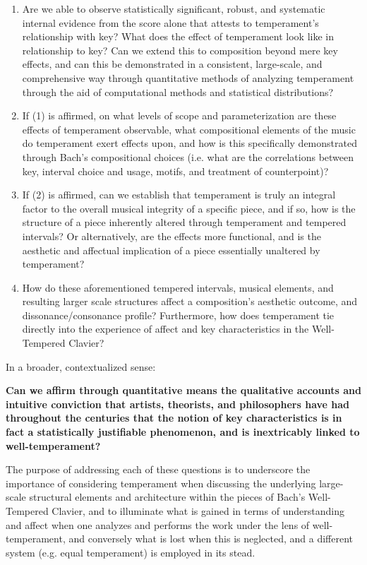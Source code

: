 \begin{enumerate}
\def\labelenumi{\arabic{enumi}.}
\tightlist
\item
  Are we able to observe statistically significant, robust, and
  systematic internal evidence from the score alone that attests to
  temperament's relationship with key? What does the effect of
  temperament look like in relationship to key? Can we extend this to
  composition beyond mere key effects, and can this be demonstrated in a
  consistent, large-scale, and comprehensive way through quantitative
  methods of analyzing temperament through the aid of computational
  methods and statistical distributions?
\item
  If (1) is affirmed, on what levels of scope and parameterization are
  these effects of temperament observable, what compositional elements
  of the music do temperament exert effects upon, and how is this
  specifically demonstrated through Bach's compositional choices (i.e.
  what are the correlations between key, interval choice and usage,
  motifs, and treatment of counterpoint)?
\item
  If (2) is affirmed, can we establish that temperament is truly an
  integral factor to the overall musical integrity of a specific piece,
  and if so, how is the structure of a piece inherently altered through
  temperament and tempered intervals? Or alternatively, are the effects
  more functional, and is the aesthetic and affectual implication of a
  piece essentially unaltered by temperament?
\item
  How do these aforementioned tempered intervals, musical elements, and
  resulting larger scale structures affect a composition's aesthetic
  outcome, and dissonance/consonance profile? Furthermore, how does
  temperament tie directly into the experience of affect and key
  characteristics in the Well-Tempered Clavier?
\end{enumerate}

In a broader, contextualized sense:

\textbf{Can we affirm through quantitative means the qualitative
accounts and intuitive conviction that artists, theorists, and
philosophers have had throughout the centuries that the notion of key
characteristics is in fact a statistically justifiable phenomenon, and
is inextricably linked to well-temperament?}

The purpose of addressing each of these questions is to underscore the
importance of considering temperament when discussing the underlying
large-scale structural elements and architecture within the pieces of
Bach's Well-Tempered Clavier, and to illuminate what is gained in terms
of understanding and affect when one analyzes and performs the work
under the lens of well-temperament, and conversely what is lost when
this is neglected, and a different system (e.g. equal temperament) is
employed in its stead.

